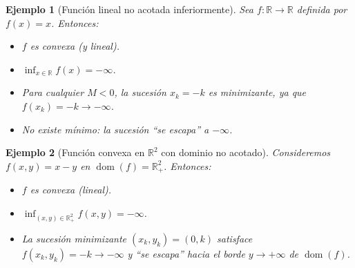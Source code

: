 \documentclass[12pt]{book}
\newtheorem{ex}{Ejemplo}
\newcommand{\dom}{\operatorname{dom}}
\theoremstyle{definition}
\theoremstyle{plain}
\theoremstyle{remark}
\begin{document}

\begin{ex}[Función lineal no acotada inferiormente]
    Sea $f: \mathbb{R} \to \mathbb{R}$ definida por $f(x) = x$. Entonces:
    \begin{itemize}
        \item $f$ es convexa (y lineal).
        \item $\inf_{x \in \mathbb{R}} f(x) = -\infty$.
        \item Para cualquier $M < 0$, la sucesión $x_k = -k$ es minimizante, ya que $f(x_k) = -k \to -\infty$.
        \item {No existe mínimo}: la sucesión ``se escapa'' a $-\infty$.
    \end{itemize}
\end{ex}


\begin{ex}[Función convexa en $\mathbb{R}^2$ con dominio no acotado]
Consideremos $f(x,y) = x - y$ en $\dom(f) = \mathbb{R}_+^2$. Entonces:
        \begin{itemize}
            \item $f$ es convexa (lineal).
            \item $\inf_{(x,y) \in \mathbb{R}^2_+} f(x,y) = -\infty$.
            \item La sucesión minimizante $(x_k, y_k) = (0, k)$ satisface $f(x_k, y_k) = -k \to -\infty$ y ``se escapa'' hacia el borde $y \to +\infty$ de $\dom(f)$.
        \end{itemize}
 
\end{ex}
\end{document}
